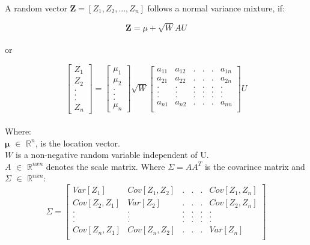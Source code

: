 \documentclass[12pt]{article}
\begin{document}
A random vector $\textbf{Z}=[Z_{1},Z_{2},...,Z_{n}]$ follows a normal variance mixture, if:


\begin{equation}
\textbf{Z}=\mu+\sqrt{W}AU
\label{eq_fdsfdsf4324}
\end{equation}\\


or

\begin{equation}
\begin{bmatrix}Z_{1}\\Z_{2}\\.\\.\\.\\Z_{n}\end{bmatrix}=
\begin{bmatrix}\mu_{1}\\ \mu_{2}\\.\\.\\.\\ \mu_{n}\end{bmatrix}
   \sqrt{W}
   \begin{bmatrix}
     a_{11} & a_{12}&.&.&.&a_{1n}\\
     a_{21} & a_{22}&.&.&.&a_{2n}\\
     . & .&.&.&.&.\\
     . & .&.&.&.&.\\
     . & .&.&.&.&.\\
     a_{n1} & a_{n2}&.&.&.&a_{nn}\\
   \end{bmatrix}
   U
\label{eq_fsdfsdf45rfdfse}   
\end{equation}\\


Where:\\


$\mathbf{\mu}$ $\in$ $\mathbb{R}^{n}$, is the location vector.\\

$W$ is a non-negative random variable independent of U.\\

$A$ $\in$ $\mathbb{R}^{nxn}$ denotes the scale matrix. Where $\Sigma=AA^{T}$ is the covarince matrix and $\Sigma$ $\in$ $\mathbb{R}^{nxn}$: \\



\begin{equation}
   \Sigma=
   \begin{bmatrix}
     Var[Z_{1}] & Cov[Z_{1},Z_{2}]&.&.&.&Cov[Z_{1},Z_{n}]\\
     Cov[Z_{2},Z_{1}] & Var[Z_{2}]&.&.&.&Cov[Z_{2},Z_{n}]\\
     . & .&.&.&.&.\\
     . & .&.&.&.&.\\
     . & .&.&.&.&.\\
     Cov[Z_{n},Z_{1}] & Cov[Z_{n},Z_{2}]&.&.&.&Var[Z_{n}]\\
   \end{bmatrix}   
\label{eq_fosdfhsdf8439e}   
\end{equation}\\
\end{document}
